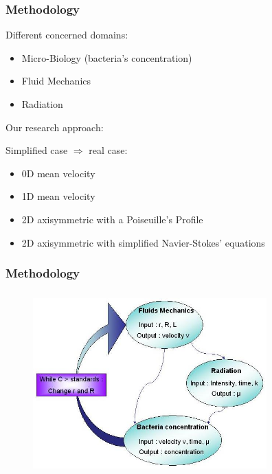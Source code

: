\documentclass[xcolor=dvipsnames,10pt]{beamer}
\begin{document}
  \begin{frame}
          \frametitle{Methodology}
  \begin{block}{Different concerned domains:}
  \begin{itemize}[<+->]
  \item Micro-Biology (bacteria's concentration)
  \item Fluid Mechanics
  \item Radiation
  \end{itemize}
  \end{block}
  \pause
   {Our research approach: }
  \begin{block}{Simplified case $\Rightarrow$ real case:}
  \begin{itemize}[<+->]
  \item 0D mean velocity
  \item 1D mean velocity
  \item 2D axisymmetric with a Poiseuille's Profile
  \item 2D axisymmetric with simplified Navier-Stokes' equations
  \end{itemize}
  \end{block}
  \end{frame}


  \begin{frame}
          \frametitle{Methodology}
          \begin{figure}
                  \includegraphics[width=9cm,height=7cm]{./images/methodology2.jpg}
          \end{figure}
  \end{frame}
\end{document}
